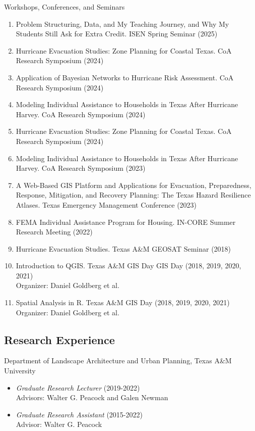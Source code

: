 \documentclass[11pt,oneside]{article}
\begin{document}
\vspace{3pt}

{Workshops, Conferences, and Seminars}
\begin{enumerate}[leftmargin=20pt]
\item Problem Structuring, Data, and My Teaching Journey, and Why My Students Still Ask for Extra Credit. ISEN Spring Seminar (2025)
\item Hurricane Evacuation Studies: Zone Planning for Coastal Texas. CoA Research Symposium (2024)
\item Application of Bayesian Networks to Hurricane Risk Assessment. CoA Research Symposium (2024)
\item Modeling Individual Assistance to Households ​in Texas After Hurricane Harvey. CoA Research Symposium (2024)
\item Hurricane Evacuation Studies: Zone Planning for Coastal Texas. CoA Research Symposium (2024)
\item Modeling Individual Assistance to Households ​in Texas After Hurricane Harvey. CoA Research Symposium (2023)
\item A Web-Based GIS Platform and Applications for Evacuation, Preparedness, Response, Mitigation, and Recovery Planning: The Texas Hazard Resilience Atlases. Texas Emergency Management Conference (2023)\\
\item FEMA Individual Assistance Program for Housing. IN-CORE Summer Research Meeting (2022)
\item Hurricane Evacuation Studies. Texas A\&M GEOSAT Seminar (2018)
\item Introduction to QGIS. Texas A\&M GIS Day GIS Day (2018, 2019, 2020, 2021)\\
      Organizer: Daniel Goldberg et al.
\item Spatial Analysis in R. Texas A\&M GIS Day (2018, 2019, 2020, 2021)\\
      Organizer: Daniel Goldberg et al.
\end{enumerate}


\subsection*{Research Experience}
{Department of Landscape Architecture and Urban Planning, Texas A\&M University}
\begin{itemize}[leftmargin=20pt]
\item \emph{Graduate Research Lecturer} (2019-2022)\\
      Advisors: Walter G. Peacock and Galen Newman
\item \emph{Graduate Research Assistant} (2015-2022)\\
      Advisor: Walter G. Peacock
\end{itemize}
\end{document}
